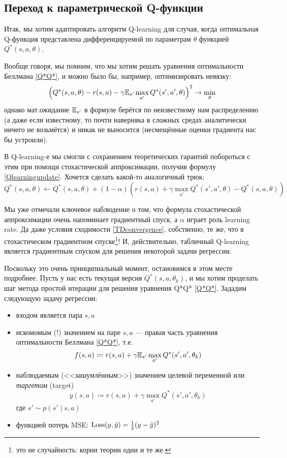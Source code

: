\subsection{Переход к параметрической Q-функции}\label{toregression}

Итак, мы хотим адаптировать алгоритм Q-learning для случая, когда оптимальная Q-функция представлена дифференцируемой по параметрам $\theta$ функцией $Q^*(s, a, \theta)$. 

Вообще говоря, мы помним, что мы хотим решать уравнения оптимальности Беллмана \eqref{Q*Q*}, и можно было бы, например, оптимизировать невязку:
$$\left( Q^*(s, a, \theta) - r(s, a) - \gamma \mathbb{E}_{s'} \max_{a'} Q^*(s', a', \theta) \right)^2 \to \min_{\theta}$$
однако мат.ожидание $\mathbb{E}_{s'}$ в формуле берётся по неизвестному нам распределению (а даже если известному, то почти наверняка в сложных средах аналитически ничего не возьмётся) и никак не выносится (несмещённые оценки градиента нас бы устроили).

В Q-learning-е мы смогли с сохранением теоретических гарантий побороться с этим при помощи стохастической аппроксимации, получив формулу \eqref{Qlearningupdate}. Хочется сделать какой-то аналогичный трюк:
$$Q^*(s, a, \theta) \leftarrow Q^*(s, a, \theta) + (1 - \alpha)\left( r(s, a) + \gamma \max_{a'} Q^*(s', a', \theta) - Q^*(s, a, \theta) \right)$$

Мы уже отмечали ключевое наблюдение о том, что формула стохастической аппроксимации очень напоминает градиентный спуск, а $\alpha$ играет роль learning rate. Да даже условия сходимости \ref{TDconvergence}, собственно, те же, что в стохастическом градиентном спуске\footnote{это не случайность: корни теории одни и те же.}! И, действительно, табличный Q-learning является градиентным спуском для решения некоторой задачи регрессии.

Поскольку это очень принципиальный момент, остановимся в этом месте подробнее. Пусть у нас есть текущая версия $Q^*(s, a, \theta_k)$, и мы хотим проделать шаг метода простой итерации для решения уравнения Q*Q* \eqref{Q*Q*}. Зададим следующую задачу регрессии:
\begin{itemize}
\item входом является пара $s, a$
\item искомомым (!) значением на паре $s, a$ --- правая часть уравнения оптимальности Беллмана \eqref{Q*Q*}, т.е.
$$f(s, a) \coloneqq r(s, a) + \gamma \mathbb{E}_{s'} \max_{a'} Q^*(s', a', \theta_k) $$
\item наблюдаемым (<<зашумлённым>>) значением целевой переменной или \emph{таргетом} (target)
\begin{equation}\label{guess}
y(s, a) \coloneqq r(s, a) + \gamma \max_{a'} Q^*(s', a', \theta_k)
\end{equation}
где $s' \sim p(s' \mid s, a)$
\item функцией потерь MSE:
$\operatorname{Loss}(y, \hat{y}) = \frac{1}{2}(y - \hat{y})^2$
\end{itemize}

